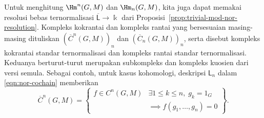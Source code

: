 \begin{catatan}\label{rem:nor-cochain}
	Untuk menghitung $\Hm^n(G,M)$ dan $\Hm_n(G,M)$, kita juga dapat memakai
	resolusi bebas ternormalisasi
	$\overline{\mathsf{L}}\to\Bbbk$ dari
	Proposisi~\ref{prop:trivial-mod-nor-resolution}. Kompleks kokrantai dan
	kompleks rantai yang bersesuaian masing-masing dituliskan
	$(\overline{C}^n(G,M))_n$ dan $(\overline{C}_n(G,M))_n$, serta disebut
	kompleks kokrantai standar ternormalisasi dan kompleks rantai standar
	ternormalisasi. Keduanya berturut-turut merupakan subkompleks dan kompleks
	kuosien dari versi semula. Sebagai contoh, untuk kasus kohomologi,
	deskripsi $\mathsf{L}_n$ dalam \eqref{eqn:nor-cochain} memberikan
	\[ \overline{C}^n(G, M) = \left\{\begin{array}{r|l}
		f \in C^n(G, M) & \exists 1 \leq k \leq n, \; g_k = 1_G \\
		& \implies f(g_1, \ldots, g_n) = 0
	\end{array}\right\}. \]
\end{catatan}
